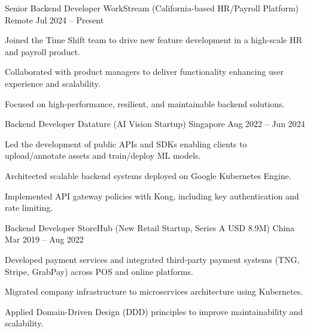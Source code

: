 
\begin{cventries}
  \cventry
    {Senior Backend Developer}
    {WorkStream (California-based HR/Payroll Platform)}
    {Remote}
    {Jul 2024 -- Present}
    {
      \begin{cvitems}
        \item {Joined the Time Shift team to drive new feature development in a high-scale HR and payroll product.}
        \item {Collaborated with product managers to deliver functionality enhancing user experience and scalability.}
        \item {Focused on high-performance, resilient, and maintainable backend solutions.}
      \end{cvitems}
    }

  \cventry
    {Backend Developer}
    {Datature (AI Vision Startup)}
    {Singapore}
    {Aug 2022 -- Jun 2024}
    {
      \begin{cvitems}
        \item {Led the development of public APIs and SDKs enabling clients to upload/annotate assets and train/deploy ML models.}
        \item {Architected scalable backend systems deployed on Google Kubernetes Engine.}
        \item {Implemented API gateway policies with Kong, including key authentication and rate limiting.}
      \end{cvitems}
    }

  \cventry
    {Backend Developer}
    {StoreHub (New Retail Startup, Series A USD 8.9M)}
    {China}
    {Mar 2019 -- Aug 2022}
    {
      \begin{cvitems}
        \item {Developed payment services and integrated third-party payment systems (TNG, Stripe, GrabPay) across POS and online platforms.}
        \item {Migrated company infrastructure to microservices architecture using Kubernetes.}
        \item {Applied Domain-Driven Design (DDD) principles to improve maintainability and scalability.}
      \end{cvitems}
    }
\end{cventries}
